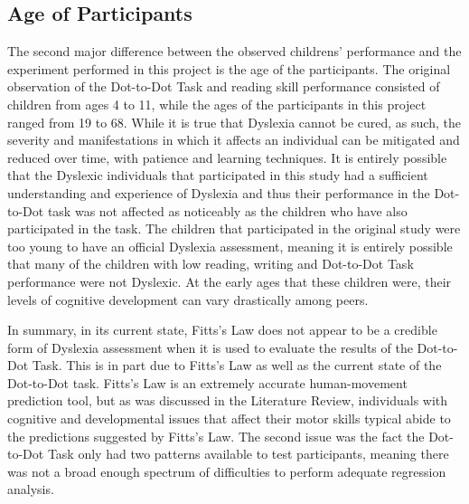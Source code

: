 	\subsection{Age of Participants}
		The second major difference between the observed childrens’ performance and the experiment performed in this project is the age of the participants. The original observation of the Dot-to-Dot Task and reading skill performance consisted of children from ages 4 to 11, while the ages of the participants in this project ranged from 19 to 68. While it is true that Dyslexia cannot be cured, as such, the severity and manifestations in which it affects an individual can be mitigated and reduced over time, with patience and learning techniques. It is entirely possible that the Dyslexic individuals that participated in this study had a sufficient understanding and experience of Dyslexia and thus their performance in the Dot-to-Dot task was not affected as noticeably as the children who have also participated in the task. The children that participated in the original study were too young to have an official Dyslexia assessment, meaning it is entirely possible that many of the children with low reading, writing and Dot-to-Dot Task performance were not Dyslexic. At the early ages that these children were, their levels of cognitive development can vary drastically among peers. 
		
		In summary, in its current state, Fitts’s Law does not appear to be a credible form of Dyslexia assessment when it is used to evaluate the results of the Dot-to-Dot Task. This is in part due to Fitts’s Law as well as the current state of the Dot-to-Dot task. Fitts’s Law is an extremely accurate human-movement prediction tool, but as was discussed in the Literature Review, individuals with cognitive and developmental issues that affect their motor skills typical abide to the predictions suggested by Fitts’s Law. The second issue was the fact the Dot-to-Dot Task only had two patterns available to test participants, meaning there was not a broad enough spectrum of difficulties to perform adequate regression analysis.
		
